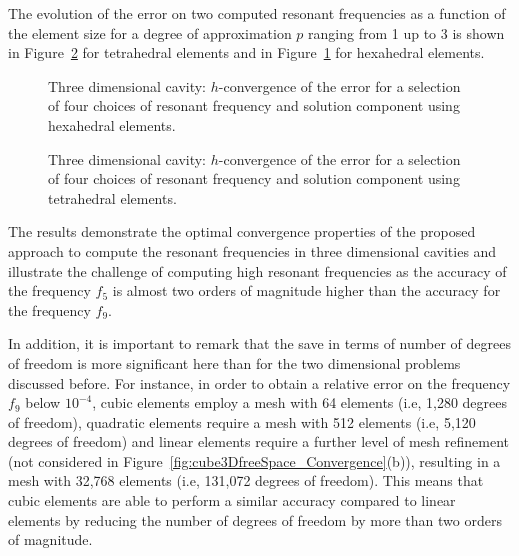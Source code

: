 The evolution of the error on two computed resonant frequencies as a function of the element size for a degree of approximation $p$ ranging from 1 up to 3 is shown in Figure~\ref{fig:cube3DfreeSpace_ConvergenceTet} for tetrahedral elements and in Figure~\ref{fig:cube3DfreeSpace_ConvergenceHex} for hexahedral elements.

\begin{figure}[!ht]
	\centering

	\caption{Three dimensional cavity: $h$-convergence of the error for a selection of four choices of resonant frequency and solution component using hexahedral elements.}
	\label{fig:cube3DfreeSpace_ConvergenceHex}
\end{figure}

\begin{figure}[!ht]
	\centering

	\caption{Three dimensional cavity: $h$-convergence of the error for a selection of four choices of resonant frequency and solution component using tetrahedral elements.}
	\label{fig:cube3DfreeSpace_ConvergenceTet}
\end{figure}
The results demonstrate the optimal convergence properties of the proposed approach to compute the resonant frequencies in three dimensional cavities and illustrate the challenge of computing high resonant frequencies as the accuracy of the frequency $f_5$ is almost two orders of magnitude higher than the accuracy for the frequency $f_9$. 

In addition, it is important to remark that the save in terms of number of degrees of freedom is more significant here than for the two dimensional problems discussed before. For instance, in order to obtain a relative error on the frequency $f_9$ below $10^{-4}$, cubic elements employ a mesh with 64 elements (i.e, 1,280 degrees of freedom), quadratic elements require a mesh with 512 elements (i.e, 5,120 degrees of freedom) and linear elements require a further level of mesh refinement (not considered in Figure~\ref{fig:cube3DfreeSpace_Convergence}(b)), resulting in a mesh with 32,768 elements (i.e, 131,072 degrees of freedom). This means that cubic elements are able to perform a similar accuracy compared to linear elements by reducing the number of degrees of freedom by more than two orders of magnitude.

